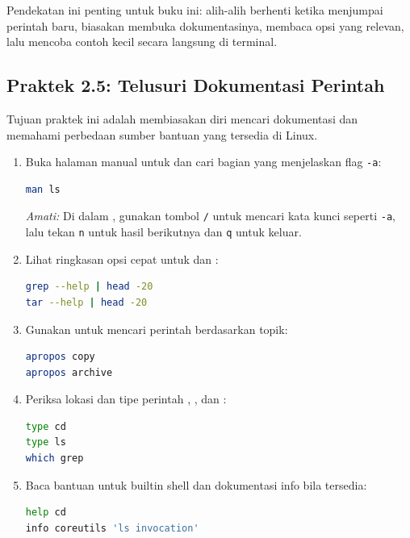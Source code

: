 Pendekatan ini penting untuk buku ini: alih-alih berhenti ketika menjumpai perintah baru, biasakan membuka dokumentasinya, membaca opsi yang relevan, lalu mencoba contoh kecil secara langsung di terminal.

\subsection*{Praktek 2.5: Telusuri Dokumentasi Perintah}

Tujuan praktek ini adalah membiasakan diri mencari dokumentasi dan memahami perbedaan sumber bantuan yang tersedia di Linux.

\begin{enumerate}
    \item Buka halaman manual untuk  dan cari bagian yang menjelaskan flag \texttt{-a}:
\begin{lstlisting}[language=bash, caption={Membuka halaman manual}]
man ls
\end{lstlisting}
    \textit{Amati:} Di dalam , gunakan tombol \texttt{/} untuk mencari kata kunci seperti \texttt{-a}, lalu tekan \texttt{n} untuk hasil berikutnya dan \texttt{q} untuk keluar.

    \item Lihat ringkasan opsi cepat untuk  dan :
\begin{lstlisting}[language=bash, caption={Ringkasan bantuan cepat}]
grep --help | head -20
tar --help | head -20
\end{lstlisting}

    \item Gunakan  untuk mencari perintah berdasarkan topik:
\begin{lstlisting}[language=bash, caption={Mencari perintah berdasarkan kata kunci}]
apropos copy
apropos archive
\end{lstlisting}

    \item Periksa lokasi dan tipe perintah , , dan :
\begin{lstlisting}[language=bash, caption={Mengenali jenis perintah di shell}]
type cd
type ls
which grep
\end{lstlisting}

    \item Baca bantuan untuk builtin shell dan dokumentasi info bila tersedia:
\begin{lstlisting}[language=bash, caption={Bantuan builtin dan info}]
help cd
info coreutils 'ls invocation'
\end{lstlisting}
\end{enumerate}

